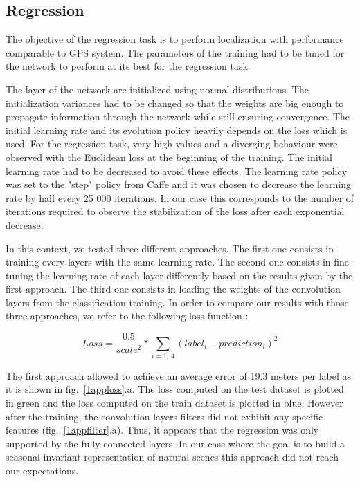 \subsection{Regression}
\label{sec:results-regression}
The objective of the regression task is to perform localization with performance comparable to GPS system. The parameters of the training had to be tuned for the network to perform at its best for the regression task.

The layer of the network are initialized using normal distributions. The initialization variances had to be changed so that the weights are big enough to propagate information through the network while still ensuring convergence.
The initial learning rate and its evolution policy heavily depends on the loss which is used. For the regression task, very high values and a diverging behaviour were observed with the Euclidean loss at the beginning of the training. The initial learning rate had to be decreased to avoid these effects. The learning rate policy was set to the "step" policy from Caffe and it was chosen to decrease the learning rate by half every 25 000 iterations. In our case this corresponds to the number of iterations required to observe the stabilization of the loss after each exponential decrease.

In this context, we tested three different approaches. The first one consists in training every layers with the same learning rate. The second one consists in fine-tuning the learning rate of each layer differently based on the results given by the first approach. The third one consists in loading the weights of the convolution layers from the classification training. In order to compare our results with those three approaches, we refer to the following loss function :

\begin{equation} 
Loss = \frac{0.5}{scale^{2}}*\sum_{i=1,\ 4}(label_{i}-prediction_{i})^{2}
\end{equation}

The first approach allowed to achieve an average error of 19.3 meters per label as it is shown in fig.~\ref{1apploss}.a. The loss computed on the test dataset is plotted in green and the loss computed on the train dataset is plotted in blue. However after the training, the convolution layers filters did not exhibit any specific features (fig.~\ref{1appfilter}.a). Thus, it appears that the regression was only supported by the fully connected layers. In our case where the goal is to build a seasonal invariant representation of natural scenes this approach did not reach our expectations. 

